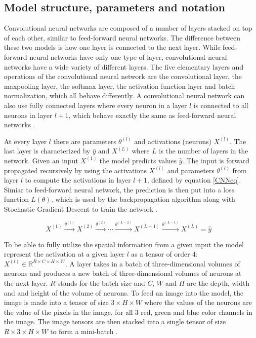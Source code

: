 \documentclass[a4paper, twoside]{article}
\begin{document}
\subsection{Model structure, parameters and notation}
Convolutional neural networks are composed of a number of layers stacked on top of each other, similar to feed-forward neural networks. The difference between these two models is how one layer is connected to the next layer. While feed-forward neural networks have only one type of layer, convolutional neural networks have a wide variety of different layers. The five elementary layers and operations of the convolutional neural network are the convolutional layer, the maxpooling layer, the softmax layer, the activation function layer and batch normalization, which all behave differently. A convolutional neural network can also use fully connected layers where every neuron in a layer $l$ is connected to all neurons in layer $l+1$, which behave exactly the same as feed-forward neural networks \cite{cs231n} \cite{convmath} \cite{convarithmetic}.

At every layer $l$ there are parameters $\theta^{(l)}$ and activations (neurons) $X^{(l)}$. The last layer is characterized by $\hat{y}$ and $X^{(L)}$ where $L$ is the number of layers in the network. Given an input $X^{(1)}$ the model predicts values $\hat{y}$. The input is forward propagated recursively by using the activations $X^{(l)}$ and parameters $\theta^{(l)}$ from layer $l$ to compute the activations in layer $l+1$, defined by equation \eqref{CNNeq}. Simiar to feed-forward neural network, the prediction is then put into a loss function $L(\theta)$, which is used by the backpropagation algorithm along with Stochastic Gradient Descent to train the network \cite{cs231n} \cite{convmath}.

\begin{equation}\label{CNNeq}
X^{(1)} \xrightarrow{\theta^{(1)}} X^{(2)}  \xrightarrow{\theta^{(2)}} \cdots  \xrightarrow{\theta^{(L-2)}} X^{(L-1)}  \xrightarrow{\theta^{(L-1)}} X^{(L)} = \hat{y}
\end{equation}

To be able to fully utilize the spatial information from a given input the model represent the activation at a given layer $l$ as a tensor of order 4: $X^{(l)} \in \mathbb{R}^{R \times C  \times H \times W}$. A layer takes in a batch of three-dimensional volumes of neurons and produces a new batch of three-dimensional volumes of neurons at the next layer. $R$ stands for the batch size and $C$, $W$ and $H$ are the depth, width and and height of the volume of neurons. To feed an image into the model, the image is made into a tensor of size $3 \times H \times W$ where the values of the neurons are the value of the pixels in the image, for all 3 red, green and blue color channels in the image. The image tensors are then stacked into a single tensor of size $R \times 3 \times H \times W$ to form a mini-batch \cite{cs231n}.
\end{document}
